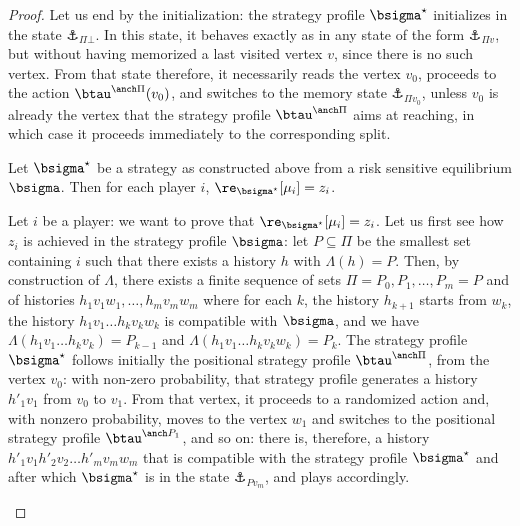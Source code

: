 \begin{proof}
    Let us end by the initialization: the strategy profile $\bsigma^\star$ initializes in the state $\anchor_{\Pi\bot}$.
    In this state, it behaves exactly as in any state of the form $\anchor_{\Pi v}$, but without having memorized a last visited vertex $v$, since there is no such vertex.
    From that state therefore, it necessarily reads the vertex $v_0$, proceeds to the action $\btau^{\anch \Pi}(v_0)$, and switches to the memory state $\anchor_{\Pi v_0}$, unless $v_0$ is already the vertex that the strategy profile $\btau^{\anch \Pi}$ aims at reaching, in which case it proceeds immediately to the corresponding split.


\begin{proposition}
    Let $\bsigma^\star$ be a strategy as constructed above from a risk sensitive equilibrium $\bsigma$. Then for each player $i$, $\re_{\bsigma^\star}[\mu_i] = z_i$.
\end{proposition}
\begin{claimproof}
    
    Let $i$ be a player: we want to prove that $\re_{\bsigma^\star}[\mu_i] = z_i$.
    Let us first see how $z_i$ is achieved in the strategy profile $\bsigma$: let $P \subseteq \Pi$ be the smallest set containing $i$ such that there exists a history $h$ with $\Lambda(h) = P$.
    Then, by construction of $\Lambda$, there exists a finite sequence of sets $\Pi = P_0, P_1, \dots, P_m = P$ and of histories $h_1 v_1 w_1, \dots, h_m v_m w_m$ where for each $k$, the history $h_{k+1}$ starts from $w_k$, the history $h_1 v_1 \dots h_k v_k w_k$ is compatible with $\bsigma$, and we have $\Lambda(h_1 v_1 \dots h_k v_k) = P_{k-1}$ and $\Lambda(h_1 v_1 \dots h_k v_k w_k) = P_k$.
    The strategy profile $\bsigma^\star$ follows initially the positional strategy profile $\btau^{\anch \Pi}$, from the vertex $v_0$: with non-zero probability, that strategy profile generates a history $h'_1 v_1$ from $v_0$ to $v_1$.
    From that vertex, it proceeds to a randomized action and, with nonzero probability, moves to the vertex $w_1$ and switches to the positional strategy profile $\btau^{\anch P_1}$, and so on: there is, therefore, a history $h'_1 v_1 h'_2 v_2 \dots h'_m v_m w_m$ that is compatible with the strategy profile $\bsigma^\star$ and after which $\bsigma^\star$ is in the state $\anchor_{P v_m}$, and plays accordingly.


\end{claimproof}
\end{proof}
